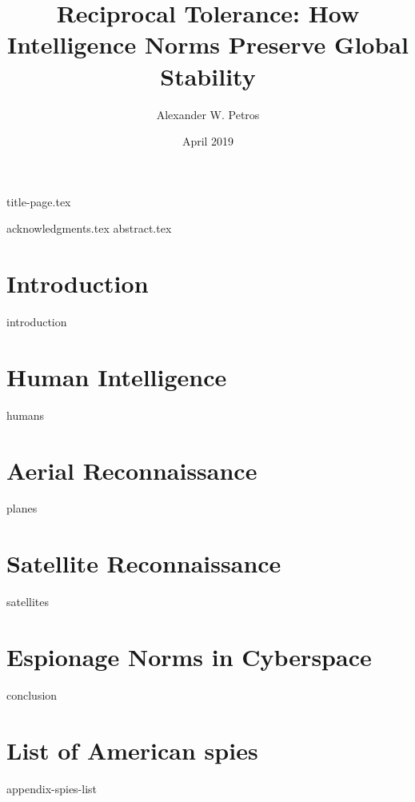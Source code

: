 \documentclass[11pt]{memoir}
\title{Reciprocal Tolerance: How Intelligence Norms Preserve Global Stability}
\author{Alexander W. Petros}
\date{April 2019}
\begin{document}
    \frontmatter
    {title-page.tex}

    \tableofcontents
    \newpage
    \thispagestyle{empty}

    \listoffigures
    \listoftables

    {acknowledgments.tex}
    {abstract.tex}


    \mainmatter
    \chapter{Introduction}
    {introduction}

    \chapter{Human Intelligence}
    {humans}

    \chapter{Aerial Reconnaissance}
    {planes}

    \chapter{Satellite Reconnaissance}
    {satellites}

    \chapter{Espionage Norms in Cyberspace}
    {conclusion}


    \appendix
    \chapter{List of American spies}
    {appendix-spies-list}
\end{document}
